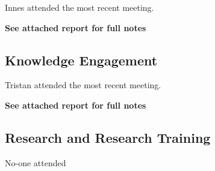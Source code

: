 \documentclass[a4paper,11pt]{article}
\begin{document}
Innes attended the most recent meeting.
	
\textbf{See attached report for full notes}

\begin{comment}
Physics Advanced had a lot of people enrolled. Enrolment in subjects with prerequisites is an issue at the moment: some students are taking the subject but haven't taken Physics in high school/equivalent.
	
2nd year Comp labs - lots of people enrolled this semester, as well as last semester (we hope Engineers will join). Comp is going well	
	
Legacy subjects are difficult to deal with.
	
Sean Crosby and Harry Quiney have done good work in fixing parts of the LMS.
	
Calculus 2 and Linear Algebra are no longer prerequisites for Physics
	
Senior demonstrators/tutor (teaching fellows) - should be doing more things	
	

\end{comment}


\subsection{Knowledge Engagement}
Tristan attended the most recent meeting.

\textbf{See attached report for full notes}

\begin{comment}

Work experience students coming soon: 24 students for the faculty (out of 100s applied). The faculty could be asking some older students to help out with this (guiding them around, etc.)
	
WIP camp: 29th April - 1st May	
	
July lectures: 100 Years of GR, discussion of gravitational waves
	
Nothing yet for Open Day
	
Colloquiums booked up until May	
\end{comment}
	
\subsection{Research and Research Training}

No-one attended	
\end{document}
